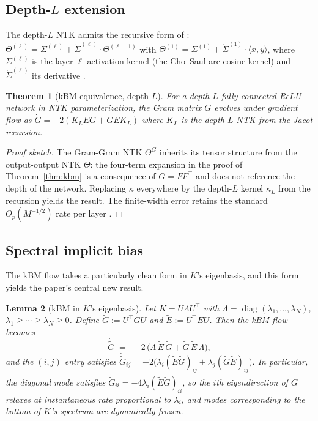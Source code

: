 \documentclass[11pt,letterpaper]{article}
\newtheorem{theorem}{Theorem}
\newtheorem{lemma}[theorem]{Lemma}
\DeclareMathOperator{\diag}{diag}
\newcommand{\E}{E}
\newcommand{\Gtilde}{\widetilde{G}}
\newcommand{\Etilde}{\widetilde{\E}}
\begin{document}
\subsection{Depth-$L$ extension}

The depth-$L$ NTK admits the recursive form of \citet{jacot2018neural}:
$\Theta^{(\ell)} = \Sigma^{(\ell)} + \dot{\Sigma}^{(\ell)} \cdot \Theta^{(\ell-1)}$
with $\Theta^{(1)} = \Sigma^{(1)} + \dot{\Sigma}^{(1)} \cdot \langle x,y\rangle$,
where $\Sigma^{(\ell)}$ is the layer-$\ell$ activation kernel (the
Cho--Saul arc-cosine kernel) and $\dot\Sigma^{(\ell)}$ its derivative
\citep{cho2009kernel}.

\begin{theorem}[kBM equivalence, depth $L$]
\label{thm:depth}
For a depth-$L$ fully-connected ReLU network in NTK parameterization, the
Gram matrix $G$ evolves under gradient flow as $\dot G = -2(K_L \E G + G \E K_L)$
where $K_L$ is the depth-$L$ NTK from the Jacot recursion.
\end{theorem}

\begin{proof}[Proof sketch]
The Gram-Gram NTK $\Theta^G$ inherits its tensor structure from the
output-output NTK $\Theta$: the four-term expansion in the proof of
Theorem~\ref{thm:kbm} is a consequence of $G = FF^\top$ and does not
reference the depth of the network. Replacing $\kappa$ everywhere by the
depth-$L$ kernel $\kappa_L$ from the recursion yields the result. The
finite-width error retains the standard $O_p(M^{-1/2})$ rate per layer
\citep{arora2019fine}.
\end{proof}

\subsection{Spectral implicit bias}

The kBM flow takes a particularly clean form in $K$'s eigenbasis, and this
form yields the paper's central new result.

\begin{lemma}[kBM in $K$'s eigenbasis]
\label{lem:eigen}
Let $K = U\Lambda U^\top$ with $\Lambda = \diag(\lambda_1, \ldots, \lambda_N)$,
$\lambda_1 \geq \cdots \geq \lambda_N \geq 0$. Define
$\Gtilde := U^\top G U$ and $\Etilde := U^\top \E U$. Then the kBM flow
becomes
\[
\dot{\Gtilde} \;=\; -2\,\bigl(\Lambda\,\Etilde\,\Gtilde + \Gtilde\,\Etilde\,\Lambda\bigr),
\]
and the $(i,j)$ entry satisfies
$\dot{\Gtilde}_{ij} = -2\bigl(\lambda_i (\Etilde\Gtilde)_{ij} +
\lambda_j (\Gtilde\Etilde)_{ij}\bigr)$. In particular, the diagonal mode
satisfies $\dot{\Gtilde}_{ii} = -4\lambda_i (\Etilde\Gtilde)_{ii}$, so the
$i$th eigendirection of $G$ relaxes at instantaneous rate proportional to
$\lambda_i$, and modes corresponding to the bottom of $K$'s spectrum are
dynamically frozen.
\end{lemma}
\end{document}
